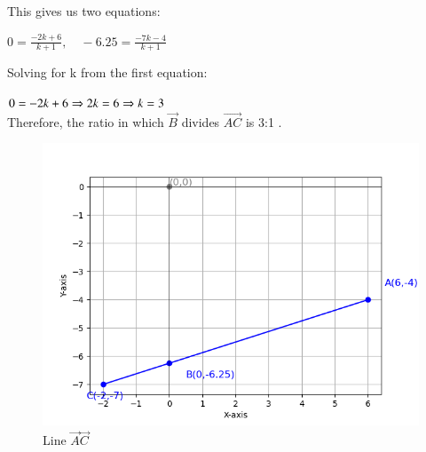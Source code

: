 \documentclass[journal]{IEEEtran}
\numberwithin{equation}{enumi}
\numberwithin{figure}{enumi}
\begin{document}
This gives us two equations:

$0 = \frac{-2k + 6}{k+1}, \quad -6.25 = \frac{-7k - 4}{k+1}$

Solving for k from the first equation:

$0 = -2k + 6 \\ \Rightarrow  2k = 6 \\ \Rightarrow k = 3$ \\
Therefore, the ratio in which  $\vec{B}$  divides $\vec{AC}$ is  3:1 .
\begin{figure}[h!]
	\centering
	\includegraphics[width=0.5\linewidth]{figs/Figure_1.png}
	\caption{ Line $\vec{A}\vec{C}$}
	\label{stemplot}
\end{figure}	
\end{document}
